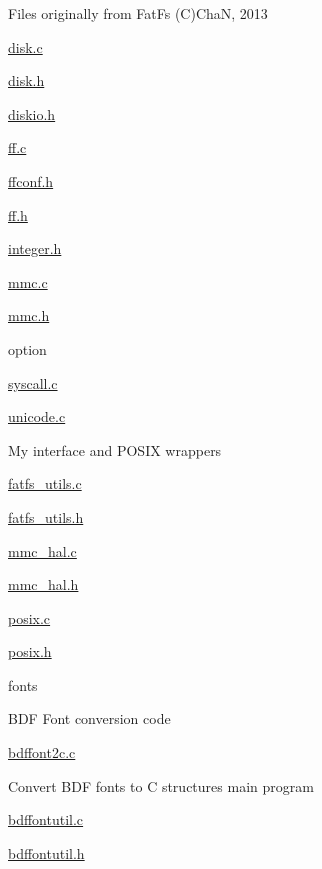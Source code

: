 \begin{DoxyItemize}
\begin{DoxyItemize}
\item Files originally from Fat\-Fs (C)Cha\-N, 2013
\begin{DoxyItemize}
\item \hyperlink{disk_8c}{disk.\-c}
\item \hyperlink{disk_8h}{disk.\-h}
\item \hyperlink{diskio_8h}{diskio.\-h}
\item \hyperlink{ff_8c}{ff.\-c}
\item \hyperlink{ffconf_8h}{ffconf.\-h}
\item \hyperlink{ff_8h}{ff.\-h}
\item \hyperlink{integer_8h}{integer.\-h}
\item \hyperlink{mmc_8c}{mmc.\-c}
\item \hyperlink{mmc_8h}{mmc.\-h}
\item option
\item \hyperlink{syscall_8c}{syscall.\-c}
\item \hyperlink{unicode_8c}{unicode.\-c}
\end{DoxyItemize}
\item My interface and P\-O\-S\-I\-X wrappers
\begin{DoxyItemize}
\item \hyperlink{fatfs__utils_8c}{fatfs\-\_\-utils.\-c}
\item \hyperlink{fatfs__utils_8h}{fatfs\-\_\-utils.\-h}
\item \hyperlink{mmc__hal_8c}{mmc\-\_\-hal.\-c}
\item \hyperlink{mmc__hal_8h}{mmc\-\_\-hal.\-h}
\item \hyperlink{posix_8c}{posix.\-c}
\item \hyperlink{posix_8h}{posix.\-h}
\end{DoxyItemize}
\end{DoxyItemize}
\item fonts
\begin{DoxyItemize}
\item B\-D\-F Font conversion code
\begin{DoxyItemize}
\item \hyperlink{bdffont2c_8c}{bdffont2c.\-c}
\begin{DoxyItemize}
\item Convert B\-D\-F fonts to C structures main program
\end{DoxyItemize}
\item \hyperlink{bdffontutil_8c}{bdffontutil.\-c}
\item \hyperlink{bdffontutil_8h}{bdffontutil.\-h}

\end{DoxyItemize}
\end{DoxyItemize}
\end{DoxyItemize}
